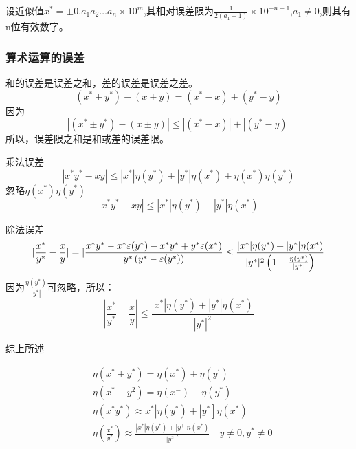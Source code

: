 \documentclass[12pt]{report}
\numberwithin{equation}{section}
\begin{document}
	设近似值$x^* = \pm 0.a_1 a_2 \ldots a_n \times 10^m$,其相对误差限为$\frac{1}{2(a_1 + 1)} \times 10^{-n+1}$,$a_1 \neq 0$,则其有n位有效数字。  

	\subsubsection{算术运算的误差}
	
	和的误差是误差之和，差的误差是误差之差。
	$$
	(x^* \pm y^*) - (x \pm y) = (x^* - x) \pm (y^* - y)
	$$
	因为
	$$
	|(x^* \pm y^*) - (x \pm y)| \leq |(x^* - x)| + |(y^* - y)|
	$$
	所以，误差限之和是和或差的误差限。

	乘法误差
	$$
	|x^* y^* -xy| \leq |x^*| \eta (y^*) + |y^*| \eta (x^*) + \eta(x^*) \eta(y^*)
	$$
	忽略$\eta(x^*) \eta(y^*)$
	$$
	|x^* y^* -xy| \leq |x^*| \eta (y^*) + |y^*| \eta (x^*)
	$$

	除法误差
	$$
	|\frac{x^*}{y^*} - \frac{x}{y}| = |\frac{x^* y^* - x^* \varepsilon (y^*) - x^* y^* + y^* \varepsilon (x^*)}{y^* \left(y^* - \varepsilon(y^*)\right)}  \\
	\leq \frac{|x^*|\eta (y^*) + |y^*|\eta(x^*)}{|y^*|^2 \left(1 - \frac{\eta(y^*)}{|y^*|}\right)}
	$$
	因为$\frac{\eta (y^*)}{|y^*|}$可忽略，所以：
	$$
	|\frac{x^*}{y^*} - \frac{x}{y}| \leq \frac{|x^*|\eta (y^*) + |y^*|\eta(x^*)}{|y^*|^2}
	$$

	综上所述  

	\begin{equation} 
		\begin{split}
			&\eta\left(x^{*}+y^{*}\right)=\eta\left(x^{*}\right)+\eta\left(y^{\prime}\right)\\
			&\eta\left(x^{*}-y^{2}\right)=\eta\left(x^{-}\right)-\eta\left(y^{*}\right)\\
			&\left.\eta\left(x^{*} y^{*}\right) \approx x^{*}\left|\eta\left(y^{*}\right)+\right| y^{*}\right] \eta\left(x^{*}\right)\\
			&\eta\left(\frac{x^{*}}{y^{*}}\right) \approx \frac{\left|x^{*}\right| \eta\left(y^{*}\right)+\left|y^{+}\right| n\left(x^{*}\right)}{\left|y^{2}\right|^{2}} \quad y \neq 0, y^{*} \neq 0
		\end{split}
	\end{equation}
\end{document}
